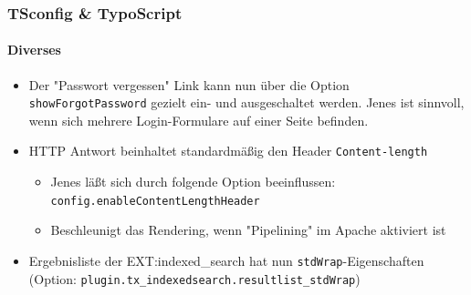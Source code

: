 
\begin{frame}[fragile]
	\frametitle{TSconfig \& TypoScript}
	\framesubtitle{Diverses}

	\begin{itemize}

		\item Der "Passwort vergessen" Link kann nun über die Option
			\texttt{showForgotPassword} gezielt ein- und ausgeschaltet werden.\newline
			Jenes ist sinnvoll, wenn sich mehrere Login-Formulare auf einer Seite befinden.

		\item HTTP Antwort beinhaltet standardmäßig den Header \texttt{Content-length}

			\begin{itemize}
				\item Jenes läßt sich durch folgende Option beeinflussen:\newline
					\texttt{config.enableContentLengthHeader}
				\item Beschleunigt das Rendering, wenn "Pipelining" im Apache aktiviert ist
			\end{itemize}

		\item Ergebnisliste der EXT:indexed\_search hat nun \texttt{stdWrap}-Eigenschaften\newline
			(Option: \texttt{plugin.tx\_indexedsearch.resultlist\_stdWrap})

	\end{itemize}

\end{frame}


